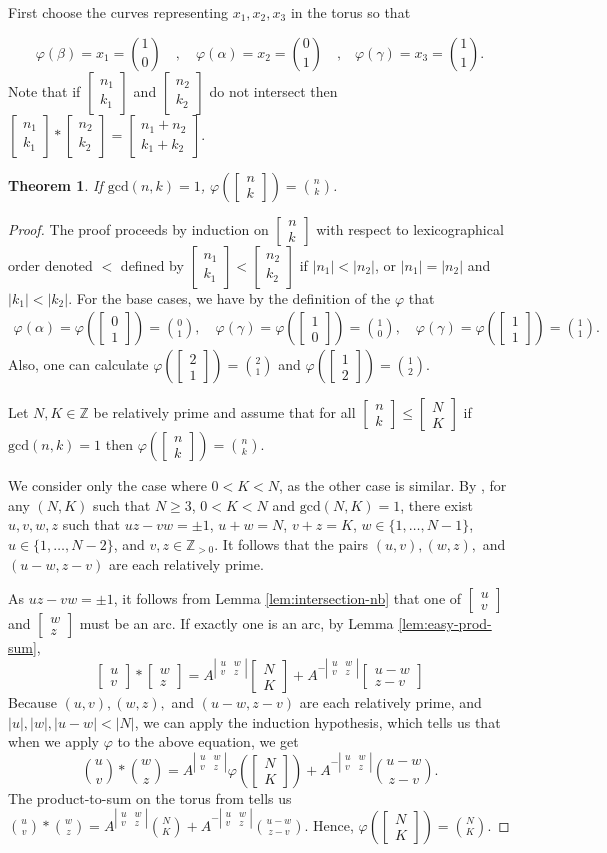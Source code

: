\documentclass{article}
\newcommand{\Z}{\mathbb{Z}}
\renewcommand{\phi}{\varphi}
\renewcommand{\gcd}{\text{gcd}}
\newcommand{\lildet}[4]{\left|\begin{smallmatrix}#1&#2\\#3&#4\end{smallmatrix}\right|}
\renewcommand{\a}{\alpha}
\renewcommand{\b}{\beta}
\newcommand{\g}{\gamma}
\newcommand{\twos}[2]{\left[\begin{smallmatrix}#1\\#2\end{smallmatrix}\right]}
\newcommand{\two}[2]{\begin{bmatrix}#1\\#2\end{bmatrix}}
\newtheorem{theorem}{Theorem}[section]
\theoremstyle{definition}
\renewcommand{\g}{\gamma}
\renewcommand{\a}{\alpha}
\renewcommand{\b}{\beta}
\begin{document}
First choose the curves representing $x_1,x_2,x_3$ in the torus so that 

\[
\phi(\b)=x_1={1\choose 0}\quad,\quad \phi(\a)=x_2={0\choose 1}\quad\text{,}\quad\phi(\g)=x_3={1\choose 1}.
\]
Note that if $\twos{n_1}{k_1}$ and $\twos{n_2}{k_2}$ do not intersect then $\twos{n_1}{k_1}*\twos{n_2}{k_2}=\twos{n_1+n_2}{k_1+k_2}$.


\begin{theorem}\label{thm:phi-of-nk}
    If $\gcd(n,k)=1$, $\phi(\twos{n}{k})={n\choose k}$.
\end{theorem}
\begin{proof}
The proof proceeds by induction on $\twos{n}{k}$ with respect to lexicographical order denoted $<$ defined by $\twos{n_1}{k_1}< \twos{n_2}{k_2}$ if $|n_1|< |n_2|$, or $|n_1|=|n_2|$ and $|k_1|<|k_2|$. For the base cases, we have by the definition of the $\phi$ that
\begin{align*}
    \phi(\a)=\phi(\twos{0}{1})={0\choose 1},\quad \phi(\g)=\phi(\twos{1}{0})={1\choose 0},\quad \phi(\g)=\phi(\twos{1}{1})={1\choose 1}.
\end{align*}
Also, one can calculate $\phi(\twos{2}{1})={2\choose 1}$ and $\phi(\twos{1}{2})={1\choose 2}$.

Let $N,K\in \Z$ be relatively prime and assume that for all $\twos{n}{k}\leq \twos{N}{K}$ if $\gcd(n,k)=1$ then $\phi(\twos{n}{k})={n\choose k}$.

We consider only the case where $0<K<N$, as the other case is similar. By \cite[Lemma~1]{FrohmanGelca}, for any $(N,K)$ such that $N\geq 3$, $0<K<N$ and $\gcd(N,K)=1$, there exist $u,v,w,z$ such that $uz-vw=\pm 1$, $u+w=N$, $v+z=K$, $w\in \{1,\ldots,N-1\}$, $u\in \{1,\ldots,N-2\}$, and $v,z\in \Z_{>0}$. It follows that the pairs $(u,v),(w,z),$ and $(u-w,z-v)$ are each relatively prime.

As $uz-vw=\pm 1$, it follows from Lemma \ref{lem:intersection-nb} that one of $\twos{u}{v}$ and $\twos{w}{z}$ must be an arc. If exactly one is an arc, by Lemma \ref{lem:easy-prod-sum},
\[
\two{u}{v}*\two{w}{z}=A^{\lildet{u}{w}{v}{z}}\two{N}{K}+A^{-\lildet{u}{w}{v}{z}}\two{u-w}{z-v}
\]
Because $(u,v),(w,z),$ and $(u-w,z-v)$ are each relatively prime, and $|u|,|w|,|u-w|<|N|$, we can apply the induction hypothesis, which tells us that when we apply $\phi$ to the above equation, we get
\[
{u\choose v}*{w\choose z}=A^{\lildet{u}{w}{v}{z}}\phi\left(\two{N}{K}\right)+A^{-\lildet{u}{w}{v}{z}}{u-w\choose z-v}.
\]
The product-to-sum on the torus from \cite{FrohmanGelca} tells us ${u\choose v}*{w\choose z}=A^{\lildet{u}{w}{v}{z}}{N\choose K}+A^{-\lildet{u}{w}{v}{z}}{u-w\choose z-v}$. Hence, $\phi(\twos{N}{K})={N\choose K}$.


\end{proof}
\end{document}
